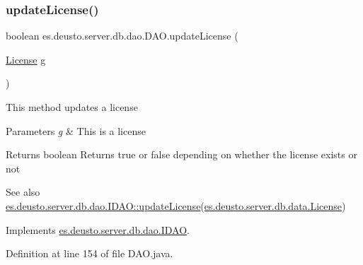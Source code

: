\mbox{\label{classes_1_1deusto_1_1server_1_1db_1_1dao_1_1_d_a_o_a98774e8d93cdd4d8d104a197bd37d4e1}} 
\subsubsection{\texorpdfstring{update\+License()}{updateLicense()}}
{\footnotesize\ttfamily boolean es.\+deusto.\+server.\+db.\+dao.\+D\+A\+O.\+update\+License (\begin{DoxyParamCaption}\item[{\hyperlink{classes_1_1deusto_1_1server_1_1db_1_1data_1_1_license}{License}}]{g }\end{DoxyParamCaption})}

This method updates a license 
\begin{DoxyParams}{Parameters}
{\em g} & This is a license \\
\hline
\end{DoxyParams}
\begin{DoxyReturn}{Returns}
boolean Returns true or false depending on whether the license exists or not 
\end{DoxyReturn}
\begin{DoxySeeAlso}{See also}
\hyperlink{interfacees_1_1deusto_1_1server_1_1db_1_1dao_1_1_i_d_a_o_a601329b95123948b10c3232687b11d5b}{es.\+deusto.\+server.\+db.\+dao.\+I\+D\+A\+O\+::update\+License}(\hyperlink{classes_1_1deusto_1_1server_1_1db_1_1data_1_1_license}{es.\+deusto.\+server.\+db.\+data.\+License}) 
\end{DoxySeeAlso}


Implements \hyperlink{interfacees_1_1deusto_1_1server_1_1db_1_1dao_1_1_i_d_a_o_a601329b95123948b10c3232687b11d5b}{es.\+deusto.\+server.\+db.\+dao.\+I\+D\+AO}.



Definition at line 154 of file D\+A\+O.\+java.

\mbox{\label{classes_1_1deusto_1_1server_1_1db_1_1dao_1_1_d_a_o_a7f6ed77294fe1f61cbebbea410cef6e0}} 
